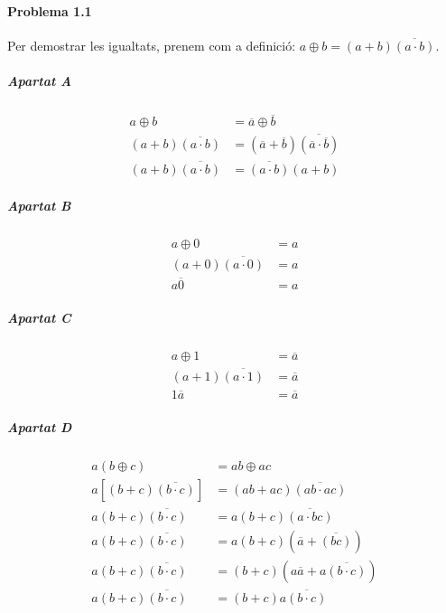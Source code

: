 \documentclass[catalan,border=15pt,class=scrartcl,multi=minipage]{standalone}
\begin{document}
\setlength{\parskip}{7pt}

\begin{minipage}{30em}

\paragraph{Problema 1.1}

Per demostrar les igualtats, prenem com a definició: $a \oplus b = \left(a + b\right)\overline{\left(a \cdot b\right)}$.

\subparagraph{Apartat A} \begin{align*}
  a \oplus b &= \overline{a} \oplus \overline{b} \\
  \left(a + b\right)\overline{\left(a \cdot b\right)} &= \left(\overline{a} + \overline{b}\right)\overline{\left(\overline{a} \cdot \overline{b}\right)} \\
  \left(a + b\right)\overline{\left(a \cdot b\right)} &= \overline{\left(a \cdot b\right)}\left(a + b\right)
\end{align*}

\subparagraph{Apartat B} \begin{align*}
  a \oplus 0 &= a \\
  \left(a + 0\right)\overline{\left(a \cdot 0\right)} &= a \\
  a \overline{0} &= a
\end{align*}

\subparagraph{Apartat C} \begin{align*}
  a \oplus 1 &= \overline{a} \\
  \left(a + 1\right)\overline{\left(a \cdot 1\right)} &= \overline{a} \\
  1 \overline{a} &= \overline{a}
\end{align*}

\subparagraph{Apartat D} \begin{align*}
  a \left(b \oplus c\right) &= ab \oplus ac \\
  a \left[ \left(b + c\right)\overline{\left(b \cdot c\right)} \right] &= \left(ab + ac\right)\overline{\left(ab \cdot ac\right)} \\
  a \left(b + c\right)\overline{\left(b \cdot c\right)} &= a \left(b + c\right)\overline{\left(a \cdot bc\right)} \\
  a \left(b + c\right)\overline{\left(b \cdot c\right)} &= a \left(b + c\right)\left(\overline{a} + \overline{\left(bc\right)}\right) \\
  a \left(b + c\right)\overline{\left(b \cdot c\right)} &= \left(b + c\right)\left(a\overline{a} + a \overline{\left(b \cdot c\right)}\right) \\
  a \left(b + c\right)\overline{\left(b \cdot c\right)} &= \left(b + c\right) a \overline{\left(b \cdot c\right)}
\end{align*}


\end{minipage}
\end{document}
